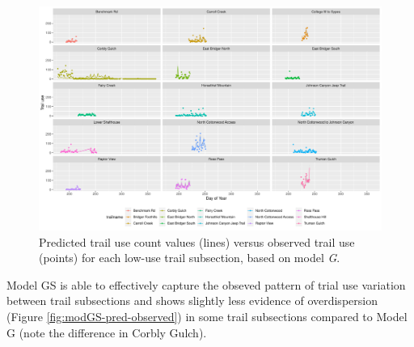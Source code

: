 \documentclass[
]{book}
\newenvironment{Shaded}{\begin{snugshade}}{\end{snugshade}}
\newcommand{\AttributeTok}[1]{\textcolor[rgb]{0.77,0.63,0.00}{#1}}
\newcommand{\CommentTok}[1]{\textcolor[rgb]{0.56,0.35,0.01}{\textit{#1}}}
\newcommand{\DecValTok}[1]{\textcolor[rgb]{0.00,0.00,0.81}{#1}}
\newcommand{\FloatTok}[1]{\textcolor[rgb]{0.00,0.00,0.81}{#1}}
\newcommand{\FunctionTok}[1]{\textcolor[rgb]{0.00,0.00,0.00}{#1}}
\newcommand{\NormalTok}[1]{#1}
\newcommand{\OtherTok}[1]{\textcolor[rgb]{0.56,0.35,0.01}{#1}}
\newcommand{\SpecialCharTok}[1]{\textcolor[rgb]{0.00,0.00,0.00}{#1}}
\newcommand{\StringTok}[1]{\textcolor[rgb]{0.31,0.60,0.02}{#1}}
\begin{document}
\begin{figure}

{\centering \includegraphics[width=1\linewidth]{../figures/low_pred_modG} 

}

\caption{Predicted trail use count values (lines) versus observed trail use (points) for each low-use trail subsection, based on model \emph{G}.}\label{fig:low-pred-G}
\end{figure}

Model GS is able to effectively capture the obseved pattern of trial use variation between trail subsections and shows slightly less evidence of overdispersion (Figure \ref{fig:modGS-pred-observed}) in some trail subsections compared to Model G (note the difference in Corbly Gulch).

\begin{Shaded}
\end{Shaded}
\end{document}
